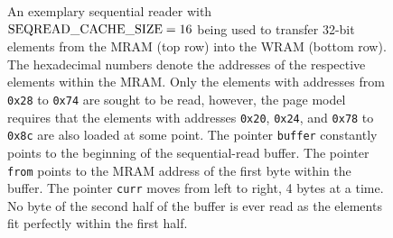 \begin{figure}

	\caption{
		An exemplary sequential reader with \(\seqreadcachesize{} = 16\) being used to transfer 32-bit elements from the MRAM (top row) into the WRAM (bottom row).
		The hexadecimal numbers denote the addresses of the respective elements within the MRAM.
		Only the elements with addresses from \lstinline|0x28| to \lstinline|0x74| are sought to be read, however, the page model requires that the elements with addresses \lstinline|0x20|, \lstinline|0x24|, and \lstinline|0x78| to \lstinline|0x8c| are also loaded at some point.
		The pointer \lstinline|buffer| constantly points to the beginning of the sequential-read buffer.
		The pointer \lstinline|from| points to the MRAM address of the first byte within the buffer.
		The pointer \lstinline|curr| moves from left to right, 4 bytes at a time.
		No byte of the second half of the buffer is ever read as the elements fit perfectly within the first half.
	}
	\label{fig:mram:reader}
\end{figure}

